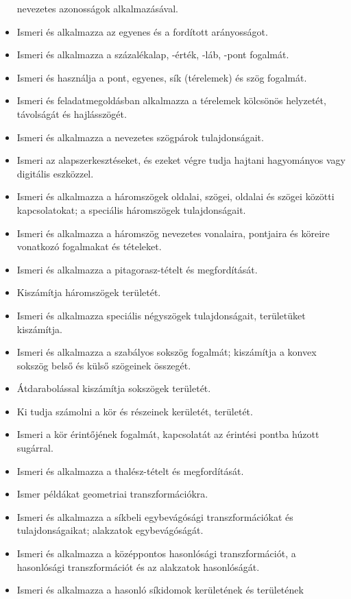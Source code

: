 \begin{itemize}
  nevezetes azonosságok alkalmazásával.
\item
  Ismeri és alkalmazza az egyenes és a fordított arányosságot.
\item
  Ismeri és alkalmazza a százalékalap, -érték, -láb, -pont fogalmát.
\item
  Ismeri és használja a pont, egyenes, sík (térelemek) és szög fogalmát.
\item
  Ismeri és feladatmegoldásban alkalmazza a térelemek kölcsönös
  helyzetét, távolságát és hajlásszögét.
\item
  Ismeri és alkalmazza a nevezetes szögpárok tulajdonságait.
\item
  Ismeri az alapszerkesztéseket, és ezeket végre tudja hajtani
  hagyományos vagy digitális eszközzel.
\item
  Ismeri és alkalmazza a háromszögek oldalai, szögei, oldalai és szögei
  közötti kapcsolatokat; a speciális háromszögek tulajdonságait.
\item
  Ismeri és alkalmazza a háromszög nevezetes vonalaira, pontjaira és
  köreire vonatkozó fogalmakat és tételeket.
\item
  Ismeri és alkalmazza a pitagorasz-tételt és megfordítását.
\item
  Kiszámítja háromszögek területét.
\item
  Ismeri és alkalmazza speciális négyszögek tulajdonságait, területüket
  kiszámítja.
\item
  Ismeri és alkalmazza a szabályos sokszög fogalmát; kiszámítja a konvex
  sokszög belső és külső szögeinek összegét.
\item
  Átdarabolással kiszámítja sokszögek területét.
\item
  Ki tudja számolni a kör és részeinek kerületét, területét.
\item
  Ismeri a kör érintőjének fogalmát, kapcsolatát az érintési pontba
  húzott sugárral.
\item
  Ismeri és alkalmazza a thalész-tételt és megfordítását.
\item
  Ismer példákat geometriai transzformációkra.
\item
  Ismeri és alkalmazza a síkbeli egybevágósági transzformációkat és
  tulajdonságaikat; alakzatok egybevágóságát.
\item
  Ismeri és alkalmazza a középpontos hasonlósági transzformációt, a
  hasonlósági transzformációt és az alakzatok hasonlóságát.
\item
  Ismeri és alkalmazza a hasonló síkidomok kerületének és területének

\end{itemize}
